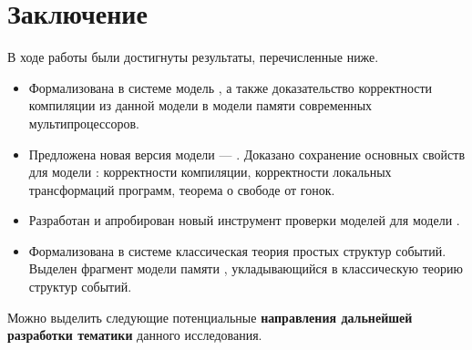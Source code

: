 \chapter*{Заключение}                       %


В ходе работы были достигнуты результаты, перечисленные ниже.

\begin{itemize}

  \item Формализована в системе \coq модель \Wkm, 
    а также доказательство корректности компиляции
    из данной модели в модели памяти современных мультипроцессоров.

  \item Предложена новая версия модели \Wkm --- \WkmS.
    Доказано сохранение основных свойств \Wkm для модели \WkmS:
    корректности компиляции, корректности локальных трансформаций программ, 
    теорема о свободе от гонок.

  \item Разработан и апробирован новый инструмент проверки моделей \wmc для модели \WkmS.

  \item Формализована в системе \coq классическая теория
    простых структур событий. Выделен фрагмент модели памяти \Wkm, 
    укладывающийся в классическую теорию структур событий.  

\end{itemize}

Можно выделить следующие потенциальные
\textbf{направления дальнейшей разработки тематики}
данного исследования.


